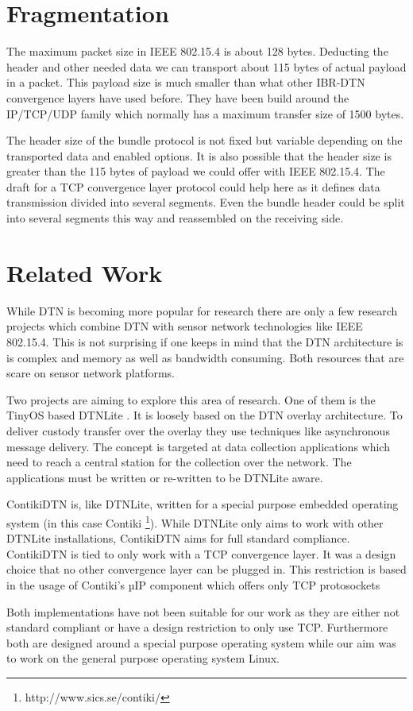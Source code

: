 \section{Fragmentation}

The maximum packet size in IEEE 802.15.4 is about 128 bytes. Deducting the header
and other needed data we can transport about 115 bytes of actual payload in a
packet. This payload size is much smaller than what other IBR-DTN convergence
layers have used before. They have been build around the IP/TCP/UDP family which
normally has a maximum transfer size of 1500 bytes.

The header size of the bundle protocol is not fixed but variable depending on
the transported data and enabled options. It is also possible that the header
size is greater than the 115 bytes of payload we could offer with IEEE 802.15.4. The
draft \cite{tcp-clayer-draft} for a TCP convergence layer protocol could help here as it
defines data transmission divided into several segments. Even the bundle
header could be split into several segments this way and reassembled on the
receiving side.

\section{Related Work}
\label{relatedwork}

While DTN is becoming more popular for research there are only a few research
projects which combine DTN with sensor network technologies like IEEE 802.15.4.
This is not surprising if one keeps in mind that the DTN architecture is is
complex and memory as well as bandwidth consuming. Both resources that are scare
on sensor network platforms.

Two projects are aiming to explore this area of research. One of them is the
TinyOS based DTNLite \cite{dtnlite}. It is loosely based on the DTN overlay
architecture. To deliver custody transfer over the overlay they use techniques
like asynchronous message delivery. The concept is targeted at data collection
applications which need to reach a central station for the collection over the
network. The applications must be written or re-written to be DTNLite aware.

ContikiDTN \cite{contikidtn} is, like DTNLite, written for a special purpose
embedded operating system (in this case Contiki
\footnote{http://www.sics.se/contiki/}). While DTNLite only aims to work with
other DTNLite installations, ContikiDTN aims for full standard compliance.
ContikiDTN is tied to only work with a TCP convergence layer. It was a design
choice that no other convergence layer can be plugged in. This restriction is based in
the usage of Contiki's µIP component which offers only TCP protosockets

Both implementations have not been suitable for our work as they are either not
standard compliant or have a design restriction to only use TCP. Furthermore both
are designed around a special purpose operating system while our aim was to work
on the general purpose operating system Linux.
